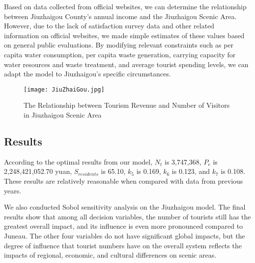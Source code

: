 \documentclass[12pt]{article}  %
\begin{document}
Based on data collected from official websites\cite{10}, we can determine the relationship between Jiuzhaigou County's annual income and the Jiuzhaigou Scenic Area. However, due to the lack of satisfaction survey data and other related information on official websites, we made simple estimates of these values based on general public evaluations. By modifying relevant constraints such as per capita water consumption, per capita waste generation, carrying capacity for water resources and waste treatment, and average tourist spending levels, we can adapt the model to Jiuzhaigou's specific circumstances.
\begin{figure}[H]
	\centering
	\texttt{[image: JiuZhaiGou.jpg]}
	\caption{The Relationship between Tourism Revenue and Number of Visitors in Jiuzhaigou Scenic Area}\label{fig:JiuZhaiGou}
\end{figure}
\subsection{Results}
According to the optimal results from our model, $N_t$ is 3,747,368, $P_e$ is 2,248,421,052.70 yuan, $S_{residents}$ is 65.10, $k_5$ is 0.169, $k_6$ is 0.123, and $k_7$ is 0.108. These results are relatively reasonable when compared with data from previous years.

We also conducted Sobol sensitivity analysis on the Jiuzhaigou model. The final results show that among all decision variables, the number of tourists still has the greatest overall impact, and its influence is even more pronounced compared to Juneau. The other four variables do not have significant global impacts, but the degree of influence that tourist numbers have on the overall system reflects the impacts of regional, economic, and cultural differences on scenic areas.
\end{document}
